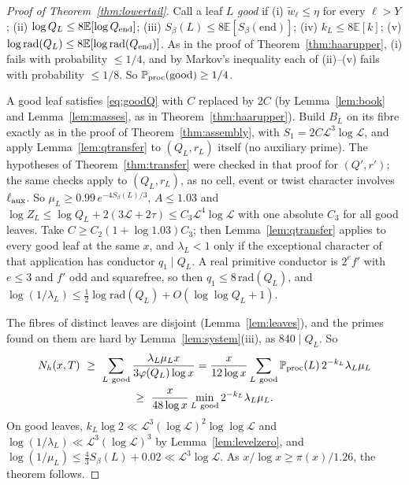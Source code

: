\documentclass[11pt,reqno]{amsart}
\theoremstyle{definition}
\newcommand{\Lc}{\mathcal L}
\newcommand{\E}{\mathbb E}
\newcommand{\PP}{\mathbb P}
\begin{document}
\begin{proof}[Proof of Theorem~\ref{thm:lowertail}]
Call a leaf $L$ \emph{good} if (i) $\tilde w_\ell\le\eta$ for every $\ell>Y$; (ii)
$\log Q_L\le8\E[\log Q_{\rm end}]$; (iii) $S_\beta(L)\le8\E[S_\beta(\mathrm{end})]$; (iv)
$k_L\le8\E[k]$; (v) $\log\mathrm{rad}(Q_L)\le8\E[\log\mathrm{rad}(Q_{\rm end})]$.  As in the proof
of Theorem~\ref{thm:haarupper}, (i) fails with probability $\le1/4$, and by
Markov's inequality each of (ii)--(v) fails with probability $\le1/8$.  So
$\PP_{\rm proc}(\text{good})\ge1/4$.

A good leaf satisfies \eqref{eq:goodQ} with $C$ replaced by $2C$ (by
Lemma~\ref{lem:book} and Lemma~\ref{lem:masses}, as in Theorem~\ref{thm:haarupper}).  Build
$B_L$ on its fibre exactly as in the proof of Theorem~\ref{thm:assembly}, with
$S_1=2C\Lc^3\log\Lc$, and apply Lemma~\ref{lem:qtransfer} to $(Q_L,r_L)$ itself
(no auxiliary prime).  The hypotheses of Theorem~\ref{thm:transfer} were
checked in that proof for $(Q',r')$; the same checks apply to $(Q_L,r_L)$, as no
cell, event or twist character involves $\ell_{\rm aux}$.  So $\mu_L\ge0.99\,e^{-4S_\beta(L)/3}$,
$A\le1.03$ and $\log Z_L\le\log Q_L+2(3\Lc+2\tau)\le C_3\Lc^4\log\Lc$ with one
absolute $C_3$ for all good leaves.  Take $C\ge C_2(1+\log1.03)C_3$; then
Lemma~\ref{lem:qtransfer} applies to every good leaf at the same $x$, and
$\lambda_L<1$ only if the exceptional character of that application has
conductor $q_1\mid Q_L$.  A real primitive conductor is $2^ef'$ with $e\le3$ and $f'$ odd and
squarefree, so then $q_1\le8\,\mathrm{rad}(Q_L)$, and
$\log(1/\lambda_L)\le\frac12\log\mathrm{rad}(Q_L)+O(\log\log Q_L+1)$.

The fibres of distinct leaves are disjoint (Lemma~\ref{lem:leaves}), and the
primes found on them are hard by Lemma~\ref{lem:system}(iii), as $840\mid Q_L$.  So
\begin{multline*}
 N_h(x,T)\ \ge\ \sum_{L\ \rm good}\frac{\lambda_L\mu_Lx}{3\varphi(Q_L)\log x}
 =\frac x{12\log x}\sum_{L\ \rm good}\PP_{\rm proc}(L)\,2^{-k_L}\lambda_L\mu_L\\
 \ge\ \frac x{48\log x}\min_{L\ \rm good}2^{-k_L}\lambda_L\mu_L .
\end{multline*}
On good leaves, $k_L\log2\ll\Lc^3(\log\Lc)^2\log\log\Lc$ and
$\log(1/\lambda_L)\ll\Lc^3(\log\Lc)^3$ by Lemma~\ref{lem:levelzero}, and
$\log(1/\mu_L)\le\frac43S_\beta(L)+0.02\ll\Lc^3\log\Lc$.  As $x/\log x\ge\pi(x)/1.26$, the
theorem follows.
\end{proof}
\end{document}
